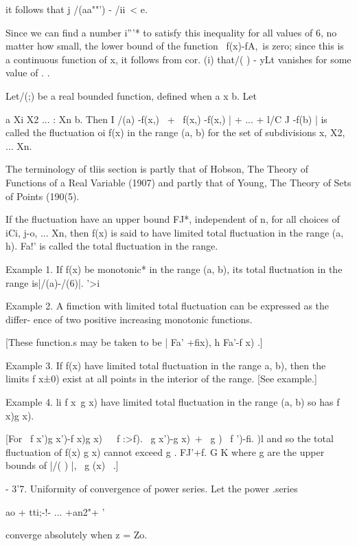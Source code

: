it follows that j /(aa""') - /ii\ < e.

Since we can find a number i'''* to satisfy this inequality for all
values of 6, no matter how small, the lower bound of the function \
f(x)-fA,\ is zero; since this is a continuous function of x, it
follows from cor. (i) that/( ) - yLt vanishes for some value of
. .


Let/(;) be a real bounded function, defined when a x b. Let

a Xi X2 ... : Xn b. Then I /(a) -f(x,) \ + \ f(x,) -f(x,) | + ... +
l/C J -f(b) | is called the fluctuation oi f(x) in the range (a, b)
for the set of subdivisions x, X2, ... Xn.

The terminology of tliis section is partly that of Hobson, The Theory
of Functions of a Real Variable (1907) and partly that of Young, The
Theory of Sets of Points (190(5).

%
%

If the fluctuation have an upper bound FJ*, independent of n, for all
choices of iCi, j-o, ... Xn, then f(x) is said to have limited total
fluctuation in the range (a, h). Fa!' is called the total fluctuation
in the range.

Example 1. If f(x) be monotonic* in the range (a, b), its total
fluctnation in the range is|/(a)-/(6)|. '>i

Example 2. A fimction with limited total fluctuation can be expressed
as the differ- ence of two positive increasing monotonic functions.

[These function.s may be taken to be | Fa' +fix), h Fa'-f x) .]

Example 3. If f(x) have limited total fluctuation in the range a, b),
then the limits f x±0) exist at all points in the interior of the
range. [See\hardsectionref{3}{2} example.]

Example 4. li f x\ g x) have limited total fluctuation in the range
(a, b) so has f x)g x).

[For \ f x')g x')-f x)g x)\ \ \ f :>f). \ g x')-g x)\ + \ g ) \ f
')-fi. )l and so the total fluctuation of f(x) g x) cannot exceed g .
FJ'+f. G K where g are the upper bounds of |/( ) |, \ g (x) \ .]

- 3'7. Uniformity of convergence of power series. Let the power
.series

ao + tti;-!- ... +an2"+  '

converge absolutely when z = Zo.

